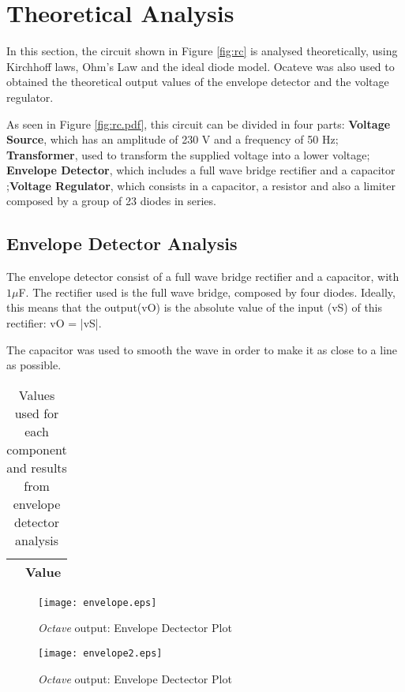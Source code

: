 \section{Theoretical Analysis} \label{sec:analysis}

In this section, the circuit shown in Figure \ref{fig:rc} is analysed theoretically, using Kirchhoff laws, Ohm's Law and the ideal diode model.
Ocateve was also used to obtained the theoretical output values of the envelope detector and the voltage regulator. 

As seen in Figure \ref{fig:rc.pdf}, this circuit can be divided in four parts: \textbf{Voltage Source}, which has an amplitude of 230 V and a frequency of 50 Hz; \textbf{Transformer}, used to transform the supplied voltage into a lower voltage; \textbf{Envelope Detector}, which includes a full wave bridge rectifier and a capacitor ;\textbf{Voltage Regulator}, which consists in a capacitor, a resistor and also a limiter composed by a group of 23 diodes in series.

\subsection{Envelope Detector Analysis}

The envelope detector consist of a full wave bridge rectifier and a capacitor, with $1\mu$F.
The rectifier used is the full wave bridge, composed by four diodes. Ideally, this means that the output(vO) is the absolute value of the input (vS) of this rectifier: vO = |vS|.

The capacitor was used to smooth the wave in order to make it as close to a line as possible.

\begin{table}[h]
  \centering
  \begin{tabular}{|c|c|}
    \hline    
     & { Value } \\ \hline
    
 \end{tabular}
 \caption{Values used for each component and results from envelope detector analysis}
  \label{tab:op}
\end{table}

\begin{figure}[h]
    \centering
    \texttt{[image: envelope.eps]}
    \caption{{\it Octave} output: Envelope Dectector Plot}
    \label{fig:OctaveOut}
\end{figure}

\begin{figure}[h]
    \centering
    \texttt{[image: envelope2.eps]}
    \caption{{\it Octave} output: Envelope Dectector Plot}
    \label{fig:OctaveOut}
\end{figure}



